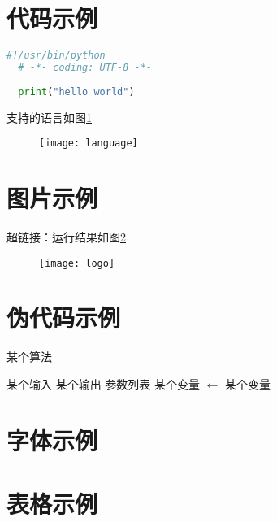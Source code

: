 \documentclass[a4paper,11pt,UTF8,AutoFakeBold= {2.88}]{ctexart}
\begin{document}
\begin{appendix}

\section{代码示例}



\begin{lstlisting}[caption={一段python代码},captionpos=b,language=python]
  #!/usr/bin/python
  # -*- coding: UTF-8 -*-
   
  print("hello world")
\end{lstlisting}

支持的语言如图\ref{language}

\begin{figure}[!htbp]
  \centering
  \texttt{[image: language]}
  \label{language}
  \end{figure}

\section{图片示例}
超链接：运行结果如图\ref{logo}
  \begin{figure}[!htbp]
  \centering
  \texttt{[image: logo]}
  \label{logo}
  \end{figure}

\section{伪代码示例}

\begin{algorithm}
\caption{某个算法}
\begin{algorithmic}[1]  %
\Require 某个输入
\Ensure 某个输出
 {参数列表}
    \State 某个变量  $\gets$ 某个变量
\EndFunction
\end{algorithmic}
\end{algorithm}

\section{字体示例}

\section{表格示例}


\end{appendix}
\end{document}
